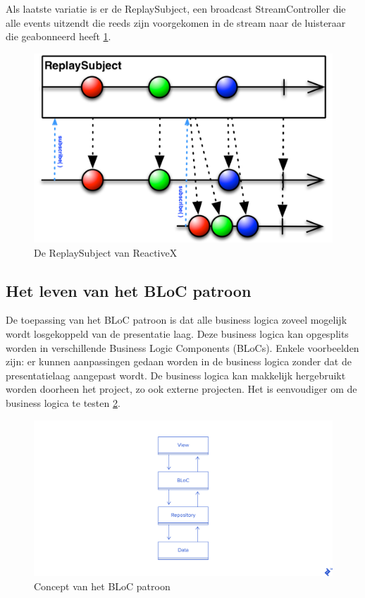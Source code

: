 Als laatste variatie is er de ReplaySubject, een broadcast StreamController die alle events uitzendt die reeds zijn voorgekomen in de stream naar de luisteraar die geabonneerd heeft \ref{fig:rxdart-replaysubject}.

\begin{figure}[H]
    \centering
    \includegraphics[width=\figureWidthModifier\linewidth]{img/stand-van-zaken/rxdart-replaysubject.png}
    \caption{De ReplaySubject van ReactiveX \autocite{Boelens2018}}
    \label{fig:rxdart-replaysubject}
\end{figure}

\subsection*{Het leven van het BLoC patroon}
De toepassing van het BLoC patroon is dat alle business logica zoveel mogelijk wordt losgekoppeld van de presentatie laag. Deze business logica kan opgesplits worden in verschillende Business Logic Components (BLoCs). Enkele voorbeelden zijn: er kunnen aanpassingen gedaan worden in de business logica zonder dat de presentatielaag aangepast wordt. De business logica kan makkelijk hergebruikt worden doorheen het project, zo ook externe projecten. Het is eenvoudiger om de business logica te testen \ref{fig:bloc-pattern}.

\begin{figure}[H]
    \centering
    \includegraphics[width=\figureWidthModifier\linewidth]{img/stand-van-zaken/bloc-pattern.png}
    \caption{Concept van het BLoC patroon \autocite{Perutovic2018}}
    \label{fig:bloc-pattern}
\end{figure}

